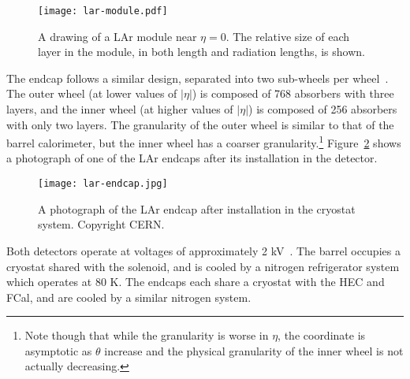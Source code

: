 

\begin{figure}
\centering
\texttt{[image: lar-module.pdf]}
\label{fig:detector:lar-module}
\caption{A drawing of a LAr module near $\eta = 0$. The relative size of each layer in the module, in both length and radiation lengths, is shown.}
\end{figure}




The endcap follows a similar design, separated into two sub-wheels per wheel~\cite{ATLASPaper}. The outer wheel (at lower values of $|\eta|$) is composed of 768 absorbers with three layers, and the inner wheel (at higher values of $|\eta|$) is composed of 256 absorbers with only two layers. The granularity of the outer wheel is similar to that of the barrel calorimeter, but the inner wheel has a coarser granularity.\footnote{Note though that while the granularity is worse in $\eta$, the coordinate is asymptotic as $\theta$ increase and the physical granularity of the inner wheel is not actually decreasing.} Figure~\ref{fig:detector:lar-endcap} shows a photograph of one of the LAr endcaps after its installation in the detector.



\begin{figure}
\centering
\texttt{[image: lar-endcap.jpg]}
\label{fig:detector:lar-endcap}
\caption{A photograph of the LAr endcap after installation in the cryostat system. Copyright CERN.}
\end{figure}


Both detectors operate at voltages of approximately 2 kV~\cite{ATLASPaper}. The barrel occupies a cryostat shared with the solenoid, and is cooled by a nitrogen refrigerator system which operates at 80 K. The endcaps each share a cryostat with the HEC and FCal, and are cooled by a similar nitrogen system.

